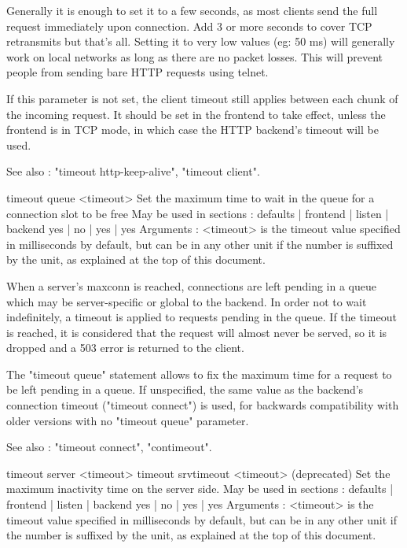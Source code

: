   Generally it is enough to set it to a few seconds, as most clients send the
  full request immediately upon connection. Add 3 or more seconds to cover TCP
  retransmits but that's all. Setting it to very low values (eg: 50 ms) will
  generally work on local networks as long as there are no packet losses. This
  will prevent people from sending bare HTTP requests using telnet.

  If this parameter is not set, the client timeout still applies between each
  chunk of the incoming request. It should be set in the frontend to take
  effect, unless the frontend is in TCP mode, in which case the HTTP backend's
  timeout will be used.

  See also : "timeout http-keep-alive", "timeout client".


timeout queue <timeout>
  Set the maximum time to wait in the queue for a connection slot to be free
  May be used in sections :   defaults | frontend | listen | backend
                                 yes   |    no    |   yes  |   yes
  Arguments :
    <timeout> is the timeout value specified in milliseconds by default, but
              can be in any other unit if the number is suffixed by the unit,
              as explained at the top of this document.

  When a server's maxconn is reached, connections are left pending in a queue
  which may be server-specific or global to the backend. In order not to wait
  indefinitely, a timeout is applied to requests pending in the queue. If the
  timeout is reached, it is considered that the request will almost never be
  served, so it is dropped and a 503 error is returned to the client.

  The "timeout queue" statement allows to fix the maximum time for a request to
  be left pending in a queue. If unspecified, the same value as the backend's
  connection timeout ("timeout connect") is used, for backwards compatibility
  with older versions with no "timeout queue" parameter.

  See also : "timeout connect", "contimeout".


timeout server <timeout>
timeout srvtimeout <timeout> (deprecated)
  Set the maximum inactivity time on the server side.
  May be used in sections :   defaults | frontend | listen | backend
                                 yes   |    no    |   yes  |   yes
  Arguments :
    <timeout> is the timeout value specified in milliseconds by default, but
              can be in any other unit if the number is suffixed by the unit,
              as explained at the top of this document.

